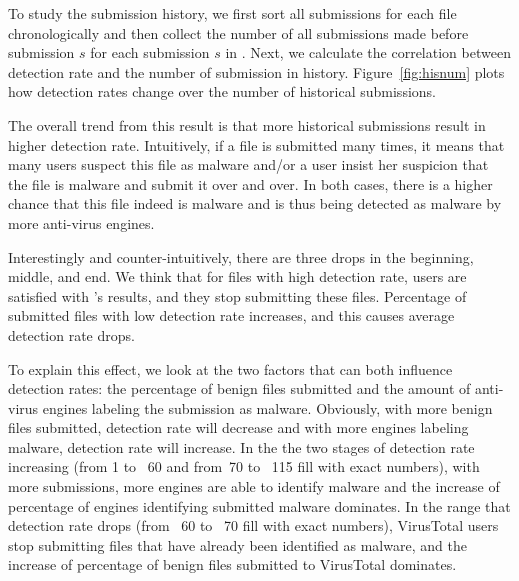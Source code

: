 To study the submission history, we first sort all submissions for each file chronologically
and then collect the number of all submissions made before submission $s$ for each submission $s$ in \vt.
Next, we calculate the correlation between detection rate and the number of submission in history.
Figure~\ref{fig:hisnum} plots how detection rates change over the number of historical submissions.

The overall trend from this result is that more historical submissions result in higher detection rate.
Intuitively, if a file is submitted many times, it means that many users suspect this file as malware
and/or a user insist her suspicion that the file is malware and submit it over and over.
In both cases, there is a higher chance that this file indeed is malware and is thus being detected as malware by more anti-virus engines.

Interestingly and counter-intuitively, there are three drops in the beginning, middle, and end. 
We think that for files with high detection rate, users are satisfied with \vt{}'s results, 
and they stop submitting these files. 
Percentage of submitted files with low detection rate increases, and this causes average detection rate drops. 


To explain this effect, we look at the two factors that can both influence detection rates:
the percentage of benign files submitted and the amount of anti-virus engines labeling the submission as malware.
Obviously, with more benign files submitted, detection rate will decrease
and with more engines labeling malware, detection rate will increase. 
In the the two stages of detection rate increasing (from 1 to ~60 and from~70 to ~115 {\color{red} fill with exact numbers}), 
with more submissions, more engines are able to identify malware 
and the increase of percentage of engines identifying submitted malware dominates. 
In the range that detection rate drops (from ~60 to ~70 {\color{red} fill with exact numbers}), 
VirusTotal users stop submitting files that have already been identified as malware,
and the increase of percentage of benign files submitted to VirusTotal dominates. 
\fi

